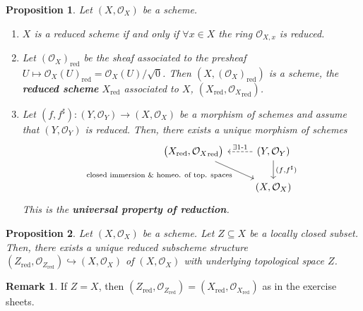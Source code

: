\documentclass[12pt]{article}
\newtheorem*{proposition}{Proposition}
\theoremstyle{definition}
\newtheorem*{remark}{Remark}
\begin{document}
\begin{proposition}
Let $(X,\mathcal O_X)$ be a scheme.

\begin{enumerate}[label=\arabic*)]
\item $X$ is a reduced scheme if and only if $\forall x\in X$ the ring $\mathcal O_{X,x}$ is reduced.

\item Let $(\mathcal O_X)_\text{red}$ be the sheaf associated to the presheaf $U\mapsto\mathcal O_X(U)_\text{red}=\mathcal O_X(U)/\sqrt0$. Then $(X,(\mathcal O_X)_\text{red})$ is a scheme, the \textbf{reduced scheme} $X_\text{red}$ associated to $X$, $(X_\text{red},{\mathcal O_X}_\text{red})$.

\item Let $(f,f^\sharp):(Y,\mathcal O_Y)\rightarrow(X,\mathcal O_X)$ be a morphism of schemes and assume that $(Y,\mathcal O_Y)$ is reduced. Then, there exists a unique morphism of schemes
\[\begin{tikzcd}\big(X_\text{red},{\mathcal O_X}_\text{red}\big)\arrow[rd,"\text{closed immersion \& homeo. of top. spaces}",swap]&(Y,\mathcal O_Y)\arrow[l,dashed,"\exists1\text{-}1",swap]\arrow[d,"(f{,}f^\sharp)"]\\&(X,\mathcal O_X)\end{tikzcd}\]
This is the \textbf{universal property of reduction}.
\end{enumerate}
\end{proposition}

\begin{proposition}
Let $(X,\mathcal O_X)$ be a scheme. Let $Z\subseteq X$ be a locally closed subset. Then, there exists a unique reduced subscheme structure $(Z_\text{red},\mathcal O_{Z_\text{red}})\hookrightarrow(X,\mathcal O_X)$ of $(X,\mathcal O_X)$ with underlying topological space $Z$.
\end{proposition}

\begin{remark}
If $Z=X$, then $(Z_\text{red},\mathcal O_{Z_\text{red}})=(X_\text{red},\mathcal O_{X_\text{red}})$ as in the exercise sheets.
\end{remark}
\end{document}
